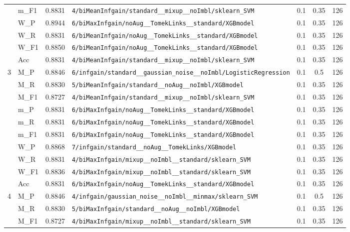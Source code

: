 \begin{table}[htbp]
\begin{tabular}{|c|l|c|>{\ttfamily\footnotesize}p{7.2cm}|c|c|c|}
 & m\_F1 & 0.8831 & \texttt{4/biMeanInfgain/standard\_\_mixup\_\_noImbl/sklearn\_SVM} & 0.1 & 0.35  & 126 \\ 
 & W\_P & 0.8944 & \texttt{6/biMaxInfgain/noAug\_\_TomekLinks\_\_standard/XGBmodel} & 0.1 & 0.35  & 126 \\ 
 & W\_R & 0.8831 & \texttt{6/biMeanInfgain/noAug\_\_TomekLinks\_\_standard/XGBmodel} & 0.1 & 0.35  & 126 \\ 
 & W\_F1 & 0.8850 & \texttt{6/biMeanInfgain/noAug\_\_TomekLinks\_\_standard/XGBmodel} & 0.1 & 0.35  & 126 \\ 
 & Acc & 0.8831 & \texttt{4/biMeanInfgain/standard\_\_mixup\_\_noImbl/sklearn\_SVM} & 0.1 & 0.35  & 126 \\ 
\hline
\multirow{10}{*}{3} & M\_P & 0.8846 & \texttt{6/infgain/standard\_\_gaussian\_noise\_\_noImbl/LogisticRegression} & 0.1 & 0.5  & 126 \\ 
 & M\_R & 0.8830 & \texttt{5/biMeanInfgain/standard\_\_noAug\_\_noImbl/XGBmodel} & 0.1 & 0.35  & 126 \\ 
 & M\_F1 & 0.8727 & \texttt{4/biMeanInfgain/standard\_\_mixup\_\_noImbl/sklearn\_SVM} & 0.1 & 0.35  & 126 \\ 
 & m\_P & 0.8831 & \texttt{6/biMaxInfgain/noAug\_\_TomekLinks\_\_standard/XGBmodel} & 0.1 & 0.35  & 126 \\ 
 & m\_R & 0.8831 & \texttt{6/biMaxInfgain/noAug\_\_TomekLinks\_\_standard/XGBmodel} & 0.1 & 0.35  & 126 \\ 
 & m\_F1 & 0.8831 & \texttt{6/biMaxInfgain/noAug\_\_TomekLinks\_\_standard/XGBmodel} & 0.1 & 0.35  & 126 \\ 
 & W\_P & 0.8868 & \texttt{7/infgain/standard\_\_noAug\_\_TomekLinks/XGBmodel} & 0.1 & 0.35  & 126 \\ 
 & W\_R & 0.8831 & \texttt{4/biMaxInfgain/mixup\_\_noImbl\_\_standard/sklearn\_SVM} & 0.1 & 0.35  & 126 \\ 
 & W\_F1 & 0.8836 & \texttt{4/biMaxInfgain/mixup\_\_noImbl\_\_standard/sklearn\_SVM} & 0.1 & 0.35  & 126 \\ 
 & Acc & 0.8831 & \texttt{6/biMaxInfgain/noAug\_\_TomekLinks\_\_standard/XGBmodel} & 0.1 & 0.35  & 126 \\ 
\hline
\multirow{10}{*}{4} & M\_P & 0.8846 & \texttt{4/infgain/gaussian\_noise\_\_noImbl\_\_minmax/sklearn\_SVM} & 0.1 & 0.5  & 126 \\ 
 & M\_R & 0.8830 & \texttt{5/biMaxInfgain/standard\_\_noAug\_\_noImbl/XGBmodel} & 0.1 & 0.35  & 126 \\ 
 & M\_F1 & 0.8727 & \texttt{4/biMaxInfgain/mixup\_\_noImbl\_\_standard/sklearn\_SVM} & 0.1 & 0.35  & 126 \\ 

\end{tabular}
\end{table}
